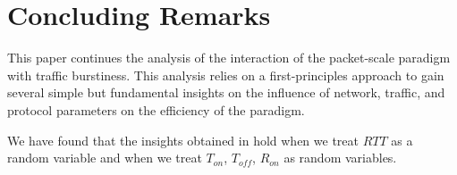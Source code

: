 \section{Concluding Remarks}
  This paper continues the analysis of the interaction of the packet-scale 
  paradigm with traffic burstiness. This analysis relies on a first-principles 
  approach to gain several simple but fundamental insights on the influence of 
  network, traffic, and protocol parameters on the efficiency of the paradigm.

  We have found that the insights obtained in \cite{Lovewell2011-Noise-TR} 
  hold when we treat $RTT$ as a random variable and when we treat $T_{on}$, 
  $T_{off}$, $R_{on}$ as random variables.
